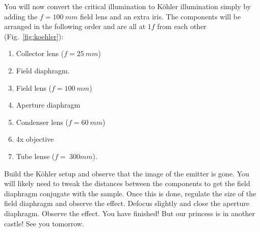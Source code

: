 \documentclass[a4paper]{report}
\begin{document}
\clearpage

You will now convert the critical illumination to K\"{o}hler illumination simply by adding the $f=100~mm$ field lens and an extra iris.
The components will be arranged in the following order and are all at $1f$ from each other (Fig.~\ref{fig:koehler}):
\begin{enumerate}
\setlength\itemsep{0.1em}
\item Collector lens ($f=25~mm$)
\item Field diaphragm.
\item Field lens ($f=100~mm$)
\item Aperture diaphragm
\item Condenser lens ($f=60~mm$)
\item 4x objective
\item Tube lense ($f=~300mm$).
\end{enumerate}

Build the K\"{o}hler setup and observe that the image of the emitter is gone. 
You will likely need to tweak the distances between the components to get the field diaphragm conjugate with the sample. 
Once this is done, regulate the size of the field diaphragm and observe the effect. 
Defocus slightly and close the aperture diaphragm. Observe the effect.
You have finished! But our princess is in another castle! See you tomorrow. 

\end{document}
